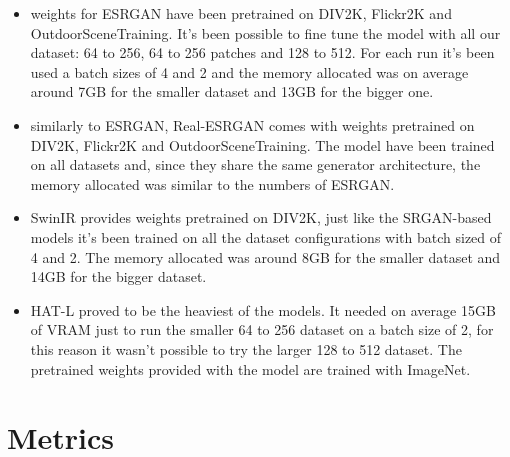 \begin{itemize}
  \item weights for ESRGAN have been pretrained on  DIV2K\cite{Agustsson_2017_CVPR_Workshops}, Flickr2K\cite{Lim_2017_CVPR_Workshops} and OutdoorSceneTraining\cite{wang2018recovering}. It's been possible to fine tune the model with all our dataset: 64 to 256, 64 to 256 patches and 128 to 512. For each run it's been used a batch sizes of 4 and 2 and the memory allocated was on average around 7GB for the smaller dataset and 13GB for the bigger one.
  \item similarly to ESRGAN, Real-ESRGAN comes with weights pretrained on DIV2K, Flickr2K and OutdoorSceneTraining. The model have been trained on all datasets and, since they share the same generator architecture, the memory allocated was similar to the numbers of ESRGAN.
  \item SwinIR provides weights pretrained on DIV2K, just like the SRGAN-based models it's been trained on all the dataset configurations with batch sized of 4 and 2. The memory allocated was around 8GB for the smaller dataset and 14GB for the bigger dataset.
  \item HAT-L proved to be the heaviest of the models. It needed on average 15GB of VRAM just to run the smaller 64 to 256 dataset on a batch size of 2, for this reason it wasn't possible to try the larger 128 to 512 dataset. The pretrained weights provided with the model are trained with ImageNet\cite{deng2009imagenet}.
\end{itemize}

\section{Metrics}
\label{sec:metrics}

